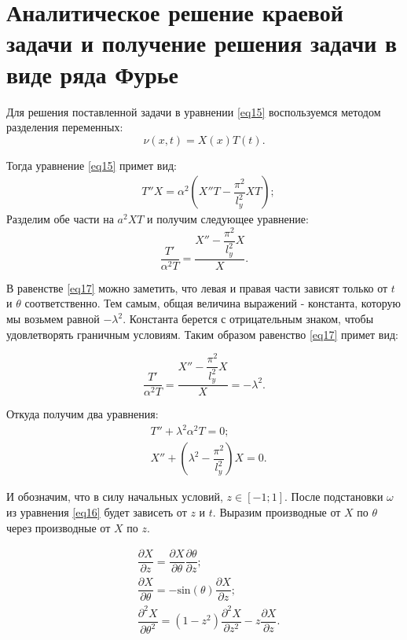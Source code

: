 \section{Аналитическое решение  краевой  задачи  и  получение  решения задачи в виде ряда Фурье}
{

Для решения поставленной задачи в уравнении \eqref{eq15} воспользуемся методом разделения переменных:
    \begin{equation}\label{eq16}
        \nu(x,t) = X(x)T(t).
    \end{equation}

Тогда уравнение \eqref{eq15} примет вид:    
    \begin{align*}
        &T''X = \alpha^2 \left(X''T - \dfrac{\pi^2}{l_y^2} XT \right);        
    \end{align*}
Разделим обе части на $a^2XT$ и получим следующее уравнение:
    \begin{equation}\label{eq17}
        \dfrac{T'}{\alpha^2T} = \dfrac{X''-\dfrac{\pi^2}{l_y^2}X}{X}.
    \end{equation}

В равенстве \eqref{eq17} можно заметить, что левая и правая части зависят только от $t$ и  $\theta$ соответственно. Тем самым, общая величина выражений - константа, которую мы возьмем равной $-\lambda^2$. Константа берется с отрицательным знаком, чтобы удовлетворять граничным условиям. Таким образом равенство \eqref{eq17} примет вид:

\begin{equation}\label{eq17}
        \dfrac{T'}{\alpha^2T} = \dfrac{
        X''-\dfrac{\pi^2}{l_y^2}X}{X} = -\lambda^2.
\end{equation}

Откуда получим два уравнения:
\begin{align*}
		& T''+\lambda^2\alpha^2T=0;\\
		& X''+(\lambda^2-\dfrac{\pi^2}{l_y^2})X = 0.
\end{align*}




И обозначим, что в силу начальных условий, $z \in [-1; 1]$. После подстановки $\omega$ из уравнения \eqref{eq16} будет зависеть от $z$ и $t$. 
Выразим производные от $X$ по $\theta$ через производные от $X$ по $z$. 

\begin{align*}
    &\dfrac{\partial X}{\partial z} = \dfrac{\partial X}{\partial \theta}  \dfrac{\partial \theta}{\partial z}; \\
    &\dfrac{\partial X}{\partial \theta} = - \text{sin}(\theta) \dfrac{\partial X}{\partial z}; \\
    &\dfrac{\partial^2 X}{\partial \theta^2} = (1 - z^2)\dfrac{\partial^2 X}{\partial z^2} - z\dfrac{\partial X}{\partial z}.
\end{align*}

}
